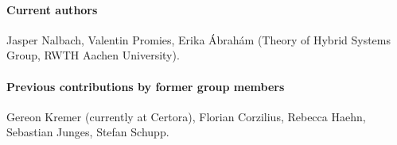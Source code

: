 \documentclass{article}
\begin{document}

\paragraph{Current authors}
Jasper Nalbach, Valentin Promies, Erika \'Abrah\'am
(Theory of Hybrid Systems Group, RWTH Aachen University).

\paragraph{Previous contributions by former group members}
Gereon Kremer (currently at Certora),
Florian Corzilius,
Rebecca Haehn,
Sebastian Junges,
Stefan Schupp.




\end{document}

